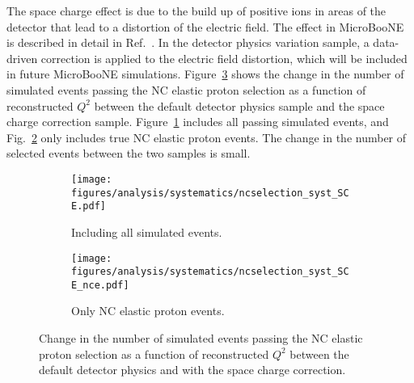     The space charge effect is due to the build up of positive ions in areas of
    the detector that lead to a distortion of the electric field. The effect in
    MicroBooNE is described in detail in Ref.~\cite{uBSCENote}. In the detector
    physics variation sample, a data-driven correction is applied to the
    electric field distortion, which will be included in future MicroBooNE
    simulations.  Figure~\ref{fig:scechange} shows the change in the number of
    simulated events passing the NC elastic proton selection as a function of
    reconstructed $Q^2$ between the default detector physics sample and the
    space charge correction sample. Figure~\ref{fig:scechangeall} includes all
    passing simulated events, and Fig.~\ref{fig:scechangence} only includes
    true NC elastic proton events. The change in the number of selected events
    between the two samples is small.
    \begin{figure}[h]
      \centering
      \begin{subfigure}[t]{2.8in}
        \texttt{[image: figures/analysis/systematics/ncselection\_syst\_SCE.pdf]}
        \caption{Including all simulated events.}
        \label{fig:scechangeall}
      \end{subfigure}
      \hspace{2pt}
      \begin{subfigure}[t]{2.8in}
        \texttt{[image: figures/analysis/systematics/ncselection\_syst\_SCE\_nce.pdf]}
        \caption{Only NC elastic proton events.}
        \label{fig:scechangence}
      \end{subfigure}
      \caption{Change in the number of simulated events passing the NC elastic
      proton selection as a function of reconstructed $Q^2$ between the default
      detector physics and with the space charge correction.}
      \label{fig:scechange}
    \end{figure}

